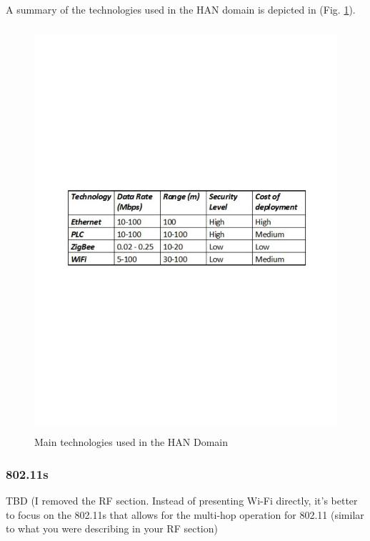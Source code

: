 \documentclass[11pt,draftclsnofoot,onecolumn]{IEEEtran}
\begin{document}
A summary of the technologies used in the HAN domain is depicted in  (Fig. \ref{fig:han}).

\begin{figure}[h!]
\centering
\includegraphics [height=15cm] {HANTechnologiesv3}
\caption{Main technologies used in the HAN Domain}
\label{fig:han}
\end{figure}


\subsubsection{802.11s}\label{tech::80211s}
TBD
(I removed the RF section. Instead of presenting Wi-Fi directly, it's better to focus on the 802.11s that allows for the multi-hop operation for 802.11 (similar to what you were describing in your RF section)
\end{document}
